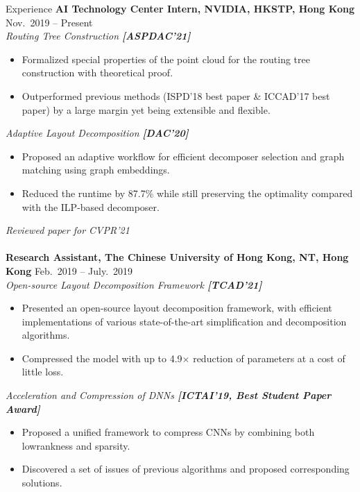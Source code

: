 
\begin{rSection}{Experience}
{\bf AI Technology Center Intern, NVIDIA, HKSTP, Hong Kong}               \hfill { Nov.~2019 -- Present} \\
\textit{Routing Tree Construction \textbf{[{ASPDAC'21}]}}
\begin{itemize}[noitemsep,topsep=-5pt]
    \item Formalized special properties of the point cloud for the routing tree construction with theoretical proof.
    \item Outperformed previous methods (ISPD'18 best paper \& ICCAD'17 best paper) by a large margin yet being extensible and flexible.
\end{itemize}
\textit{Adaptive Layout Decomposition \textbf{[{DAC'20}]}}
\begin{itemize}[noitemsep,topsep=-5pt]
    \item Proposed an adaptive workflow for efficient decomposer selection and graph matching using graph embeddings.
    \item Reduced the runtime by 87.7\% while still preserving the optimality compared with the ILP-based decomposer.
\end{itemize}
\textit{Reviewed paper for CVPR'21}\\ \\
{\bf Research Assistant, The Chinese University of Hong Kong, NT, Hong Kong}               \hfill { Feb.~2019 -- July.~2019} \\
\textit{Open-source Layout Decomposition Framework \textbf{[{TCAD'21}]}}
\begin{itemize}[noitemsep,topsep=-5pt]
    \item Presented an open-source layout decomposition framework, with efficient implementations of various state-of-the-art simplification and decomposition algorithms.
    \item Compressed the model with up to 4.9$\times$ reduction of parameters at a cost of little loss.
\end{itemize}

\textit{Acceleration and Compression of DNNs \textbf{[{ICTAI'19, Best Student Paper Award}]}}
\begin{itemize}[noitemsep,topsep=-5pt]
    \item Proposed a unified framework to compress CNNs by combining both lowrankness and sparsity.
    \item Discovered a set of issues of previous algorithms and proposed corresponding solutions. \\
\end{itemize}


\end{rSection}
